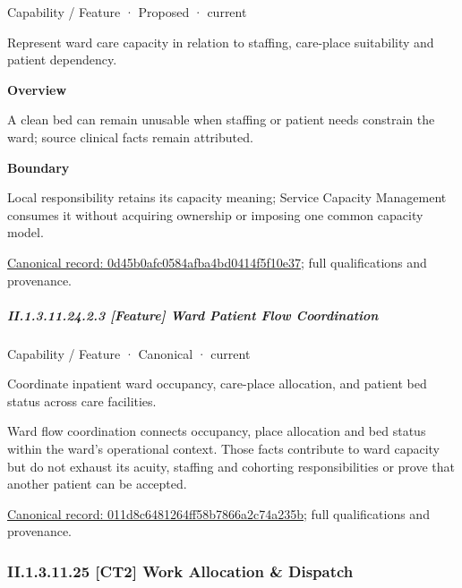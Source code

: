 \label{element:0d45b0afc0584afba4bd0414f5f10e37}
{\small Capability / Feature · Proposed · current}\par

Represent ward care capacity in relation to staffing, care-place suitability and patient dependency.



\textbf{Overview}



A clean bed can remain unusable when staffing or patient needs constrain the ward; source clinical facts remain attributed.



\textbf{Boundary}



Local responsibility retains its capacity meaning; Service Capacity Management consumes it without acquiring ownership or imposing one common capacity model.


{\footnotesize \href{../../../../continuum/strategy/capability/feature/0d45b0afc0584afba4bd0414f5f10e37.md}{Canonical record: 0d45b0afc0584afba4bd0414f5f10e37}; full qualifications and provenance.}\par
\subparagraph*{II.1.3.11.24.2.3 [Feature] Ward Patient Flow Coordination}
\label{navigation:II.1.3.11.24.2.3}

\label{element:011d8c6481264ff58b7866a2c74a235b}
{\small Capability / Feature · Canonical · current}\par

Coordinate inpatient ward occupancy, care-place allocation, and patient bed status across care facilities.



Ward flow coordination connects occupancy, place allocation and bed status within the ward's operational context. Those facts contribute to ward capacity but do not exhaust its acuity, staffing and cohorting responsibilities or prove that another patient can be accepted.


{\footnotesize \href{../../../../continuum/strategy/capability/feature/011d8c6481264ff58b7866a2c74a235b.md}{Canonical record: 011d8c6481264ff58b7866a2c74a235b}; full qualifications and provenance.}\par
\subsubsection*{II.1.3.11.25 [CT2] Work Allocation \& Dispatch}
\label{navigation:II.1.3.11.25}

